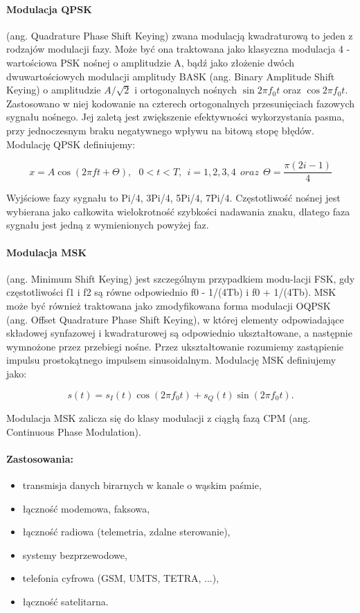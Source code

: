 \documentclass[a4paper,twoside]{report}
\begin{document}
\paragraph{Modulacja QPSK} (ang. Quadrature Phase Shift Keying) zwana modulacją kwadraturową to jeden z rodzajów modulacji fazy. Może być ona traktowana jako klasyczna modulacja 4 - wartościowa PSK nośnej o amplitudzie A, bądź jako złożenie dwóch dwuwartościowych modulacji amplitudy BASK (ang. Binary Amplitude Shift Keying) o amplitudzie $A/\sqrt{2}$  i ortogonalnych nośnych $\sin 2\pi f_{0}t $  oraz  $\cos 2\pi f_{0}t $. Zastosowano w niej kodowanie na czterech ortogonalnych przesunięciach fazowych sygnału nośnego. Jej zaletą jest zwiększenie efektywności wykorzystania pasma, przy jednoczesnym braku negatywnego wpływu na bitową stopę błędów. Modulację QPSK definiujemy:

\begin{equation}
x=A\cos(2\pi ft + \Theta), ~~~0<t<T,~~i=1,2,3,4~~oraz~~\Theta = \dfrac{\pi(2i-1)}{4}
\end{equation}

Wyjściowe fazy sygnału to Pi/4, 3Pi/4, 5Pi/4, 7Pi/4. Częstotliwość nośnej jest wybierana jako całkowita wielokrotność szybkości nadawania znaku, dlatego faza sygnału jest jedną z wymienionych powyżej faz.

\paragraph{Modulacja MSK}
 (ang. Minimum Shift Keying) jest szczególnym przypadkiem modu-lacji FSK, gdy częstotliwości f1 i f2 są równe odpowiednio f0 - 1/(4Tb) i f0 + 1/(4Tb). MSK może być również traktowana jako zmodyfikowana forma modulacji OQPSK (ang. Offset Quadrature Phase Shift Keying), w której elementy odpowiadające składowej synfazowej i kwadraturowej są odpowiednio ukształtowane, a następnie wymnożone przez przebiegi nośne. Przez ukształtowanie rozumiemy zastąpienie impulsu prostokątnego impulsem sinusoidalnym. Modulację MSK definiujemy jako:
 
\begin{equation}
s(t)=s_{I}(t)\cos (2\pi f_{0}t)+s_{Q}(t)\sin (2\pi f_{0}t).
\end{equation}

Modulacja MSK zalicza się do klasy modulacji z ciągłą fazą CPM (ang. Continuous Phase Modulation).


\paragraph{Zastosowania:}
\begin{itemize}
\item transmisja danych birarnych w kanale o wąskim paśmie,
\item łączność modemowa, faksowa,
\item łączność radiowa (telemetria, zdalne sterowanie),
\item systemy bezprzewodowe,
\item telefonia cyfrowa (GSM, UMTS, TETRA, ...),
\item łączność satelitarna.
\end{itemize}
\end{document}

